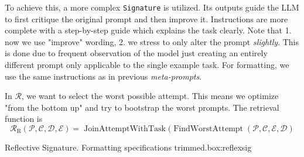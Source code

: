 To achieve this, a more complex \texttt{Signature} is utilized. Its outputs guide the LLM to first critique the original prompt
and then improve it. Instructions are more complete with a step-by-step guide which explains the task clearly.
Note that 1. now we use "improve" wording, 2. we stress to only alter the prompt \textit{slightly}. This is done due to 
frequent observation of the model just creating an entirely different prompt only applicable to the single example task.
For formatting, we use the same instructions as in previous \textit{meta-prompts}.

In $\mathcal{R}$, we want to select the worst possible attempt. This means we optimize "from the bottom up" and try to bootstrap the
worst prompts. The retrieval function is
\begin{equation}
    \mathcal{R}_{\text{R}}(\mathscr{P}, \mathcal{C}, \mathcal{D}, \mathcal{E}) = \operatorname{JoinAttemptWithTask}(\operatorname{FindWorstAttempt}(\mathscr{P}, \mathcal{C}, \mathcal{E}, \mathcal{D})
\end{equation}

\begin{figurebox}{Reflective Signature. Formatting specifications trimmed.}{box:reflexsig}

\end{figurebox}


